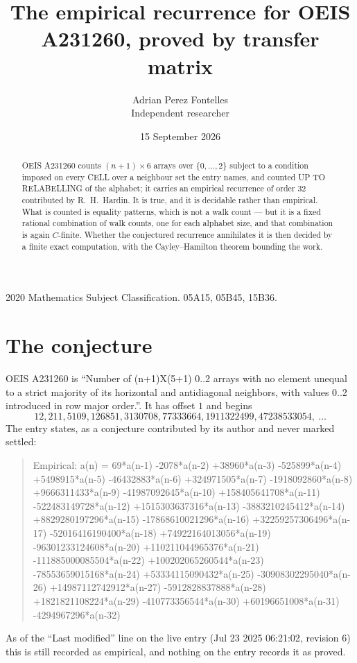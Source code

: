 \documentclass[11pt,a4paper]{article}
\title{The empirical recurrence for OEIS A231260, proved by transfer matrix}
\author{Adrian Perez Fontelles\\ \small Independent researcher}
\date{15 September 2026}
\theoremstyle{plain}
\theoremstyle{definition}
\begin{document}
\maketitle

\begin{abstract}
OEIS A231260 counts $(n+1)\times6$ arrays over $\{0,\dots,2\}$ subject to a condition imposed on
every CELL over a neighbour set the entry names, and counted UP TO RELABELLING of the
alphabet; it carries an empirical recurrence of order $32$ contributed by
R.~H.~Hardin. It is true, and it is decidable rather than empirical. What is counted is
equality patterns, which is not a walk count --- but it is a fixed rational combination of
walk counts, one for each alphabet size, and that combination is again $C$-finite. Whether the
conjectured recurrence annihilates it is then decided by a finite exact computation, with the
Cayley--Hamilton theorem bounding the work.
\end{abstract}

\noindent\small 2020 Mathematics Subject Classification. 05A15, 05B45, 15B36.\normalsize

\section{The conjecture}

OEIS A231260 is ``Number of (n+1)X(5+1) 0..2 arrays with no element unequal to a strict majority of its horizontal and antidiagonal neighbors, with values 0..2 introduced in row major order.''. It has offset $1$ and begins
\[
12, 211, 5109, 126851, 3130708, 77333664, 1911322499, 47238533054,\ \dots
\]
The entry states, as a conjecture contributed by its author and never marked settled:
\begin{quote}
Empirical: a(n) = 69*a(n-1) -2078*a(n-2) +38960*a(n-3) -525899*a(n-4) +5498915*a(n-5) -46432883*a(n-6) +324971505*a(n-7) -1918092860*a(n-8) +9666311433*a(n-9) -41987092645*a(n-10) +158405641708*a(n-11) -522483149728*a(n-12) +1515303637316*a(n-13) -3883210245412*a(n-14) +8829280197296*a(n-15) -17868610021296*a(n-16) +32259257306496*a(n-17) -52016416190400*a(n-18) +74922164013056*a(n-19) -96301233124608*a(n-20) +110211044965376*a(n-21) -111885000085504*a(n-22) +100202065260544*a(n-23) -78553659015168*a(n-24) +53334115090432*a(n-25) -30908302295040*a(n-26) +14987112742912*a(n-27) -5912828837888*a(n-28) +1821821108224*a(n-29) -410773356544*a(n-30) +60196651008*a(n-31) -4294967296*a(n-32)
\end{quote}
As of the ``Last modified'' line on the live entry (Jul 23 2025 06:21:02, revision 6) this is still
recorded as empirical, and nothing on the entry records it as proved.
\end{document}
